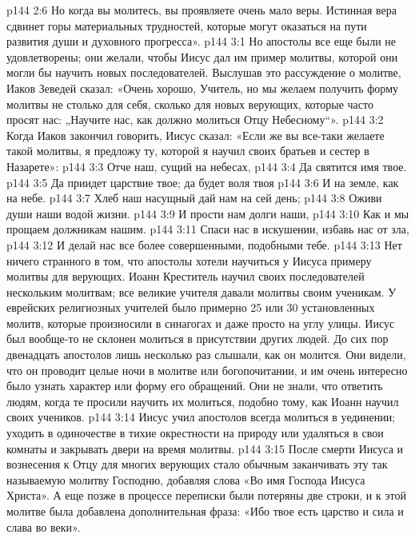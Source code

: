 \vs p144 2:6 Но когда вы молитесь, вы проявляете очень мало веры. Истинная вера сдвинет горы материальных трудностей, которые могут оказаться на пути развития души и духовного прогресса».
\vs p144 3:1 Но апостолы все еще были не удовлетворены; они желали, чтобы Иисус дал им пример молитвы, которой они могли бы научить новых последователей. Выслушав это рассуждение о молитве, Иаков Зеведей сказал: «Очень хорошо, Учитель, но мы желаем получить форму молитвы не столько для себя, сколько для новых верующих, которые часто просят нас: „Научите нас, как должно молиться Отцу Небесному“».
\vs p144 3:2 Когда Иаков закончил говорить, Иисус сказал: «Если же вы все\hyp{}таки желаете такой молитвы, я предложу ту, которой я научил своих братьев и сестер в Назарете»:
\vsetoff
\vs p144 3:3 Отче наш, сущий на небесах,
\vs p144 3:4 \hsetoff Да святится имя твое.
\vs p144 3:5 Да приидет царствие твое; да будет воля твоя
\vs p144 3:6 \hsetoff И на земле, как на небе.
\vs p144 3:7 Хлеб наш насущный дай нам на сей день;
\vs p144 3:8 \hsetoff Оживи души наши водой жизни.
\vs p144 3:9 И прости нам долги наши,
\vs p144 3:10 \hsetoff Как и мы прощаем должникам нашим.
\vs p144 3:11 Спаси нас в искушении, избавь нас от зла,
\vs p144 3:12 \hsetoff И делай нас все более совершенными, подобными тебе.
\vsetoff
\vs p144 3:13 Нет ничего странного в том, что апостолы хотели научиться у Иисуса примеру молитвы для верующих. Иоанн Креститель научил своих последователей нескольким молитвам; все великие учителя давали молитвы своим ученикам. У еврейских религиозных учителей было примерно 25 или 30 установленных молитв, которые произносили в синагогах и даже просто на углу улицы. Иисус был вообще\hyp{}то не склонен молиться в присутствии других людей. До сих пор двенадцать апостолов лишь несколько раз слышали, как он молится. Они видели, что он проводит целые ночи в молитве или богопочитании, и им очень интересно было узнать характер или форму его обращений. Они не знали, что ответить людям, когда те просили научить их молиться, подобно тому, как Иоанн научил своих учеников.
\vs p144 3:14 Иисус учил апостолов всегда молиться в уединении; уходить в одиночестве в тихие окрестности на природу или удаляться в свои комнаты и закрывать двери на время молитвы.
\vs p144 3:15 После смерти Иисуса и вознесения к Отцу для многих верующих стало обычным заканчивать эту так называемую молитву Господню, добавляя слова «Во имя Господа Иисуса Христа». А еще позже в процессе переписки были потеряны две строки, и к этой молитве была добавлена дополнительная фраза: «Ибо твое есть царство и сила и слава во веки».
